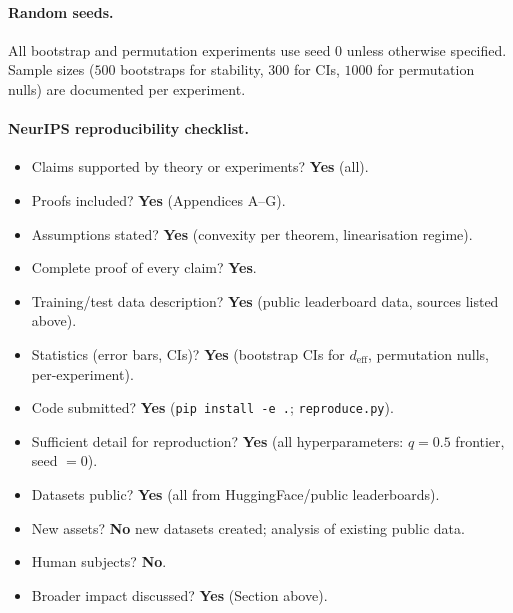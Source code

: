 \documentclass{article}
\begin{document}
\paragraph{Random seeds.} All bootstrap and permutation experiments
use seed $0$ unless otherwise specified. Sample sizes ($500$
bootstraps for stability, $300$ for CIs, $1000$ for permutation
nulls) are documented per experiment.

\paragraph{NeurIPS reproducibility checklist.}
\begin{itemize}[leftmargin=2em, itemsep=1pt]
\item Claims supported by theory or experiments? \textbf{Yes} (all).
\item Proofs included? \textbf{Yes} (Appendices A--G).
\item Assumptions stated? \textbf{Yes} (convexity per theorem, linearisation regime).
\item Complete proof of every claim? \textbf{Yes}.
\item Training/test data description? \textbf{Yes} (public leaderboard data, sources listed above).
\item Statistics (error bars, CIs)? \textbf{Yes} (bootstrap CIs for $d_{\mathrm{eff}}$, permutation nulls, per-experiment).
\item Code submitted? \textbf{Yes} (\texttt{pip install -e .}; \texttt{reproduce.py}).
\item Sufficient detail for reproduction? \textbf{Yes} (all hyperparameters: $q = 0.5$ frontier, seed $= 0$).
\item Datasets public? \textbf{Yes} (all from HuggingFace/public leaderboards).
\item New assets? \textbf{No} new datasets created; analysis of existing public data.
\item Human subjects? \textbf{No}.
\item Broader impact discussed? \textbf{Yes} (Section above).
\end{itemize}
\end{document}
